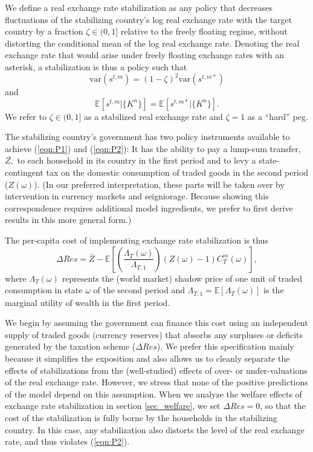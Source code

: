 \documentclass[12pt,letter]{article}
\theoremstyle{break} \theorembodyfont{\normalfont\itshape}
\theoremstyle{break}
\theoremstyle{break} \theorembodyfont{\normalfont\itshape}
\theoremstyle{break} \theorembodyfont{\normalfont\itshape}
\begin{document}
We define a real exchange rate stabilization as any policy that
decreases fluctuations of the stabilizing country's log real exchange
rate with the target country by a fraction $\zeta \in (0, 1]$ relative
to the freely floating regime, without distorting the conditional mean
of the log real exchange rate. Denoting the real exchange rate that
would arise under freely floating exchange rates with an asterisk, a
stabilization is thus a policy such that
\begin{equation}\tag{P1}\label{eqn:P1}
  \text{var} \left( s^{t,m} \right) = (1 - \zeta)^2 \text{var} \left( s^{t, m\ast} \right)
\end{equation}
and
\begin{equation}\tag{P2}\label{eqn:P2}
  \mathbb{E}\left[ s^{t,m}|\{K^n\} \right] = \mathbb{E}\left[ s^{t,m\ast} |\{K^n\}\right].
\end{equation}
We refer to \(\zeta \in(0,1] \) as a stabilized real exchange rate and
\(\zeta=1\) as a ``hard'' peg.

The stabilizing country's government has two policy instruments
available to achieve (\ref{eqn:P1}) and (\ref{eqn:P2}): It has the
ability to pay a lump-sum transfer, $\bar{Z,}$ to each household in
its country in the first period and to levy a state-contingent tax on
the domestic consumption of traded goods in the second period
($Z(\omega)$). (In our preferred interpretation, these parts will be
taken over by intervention in currency markets and seigniorage.
Because showing this correspondence requires additional model
ingredients, we prefer to first derive results in this more general
form.)


The per-capita cost of implementing exchange rate stabilization is
thus\begin{equation} \Delta Res = \bar{Z} - \mathbb{E}\left[ \left(
      \frac{\Lambda_T(\omega)}{\Lambda_{T, 1}} \right)
    \left(Z(\omega)-1\right) C^m_T(\omega) \right],
  \label{eqn:kappacost}
\end{equation}
where $\Lambda_T(\omega)$ represents the (world market) shadow price
of one unit of traded consumption in state $\omega$ of the second
period and $\Lambda_{T, 1} = \mathbb{E}[\Lambda_T(\omega)]$ is the
marginal utility of wealth in the first period.

We begin by assuming the government can finance this cost using an
independent supply of traded goods (currency reserves) that absorbs
any surpluses or deficits generated by the taxation scheme
($\Delta Res$). We prefer this specification mainly because it
simplifies the exposition and also allows us to cleanly separate the
effects of stabilizations from the (well-studied) effects of over- or
under-valuations of the real exchange rate. However, we stress that
none of the positive predictions of the model depend on this
assumption. When we analyze the welfare effects of exchange rate
stabilization in section \ref{sec_welfare}, we set \(\Delta Res=0\),
so that the cost of the stabilization is fully borne by the households
in the stabilizing country. In this case, any stabilization also
distorts the level of the real exchange rate, and thus violates
(\ref{eqn:P2}).
\end{document}
